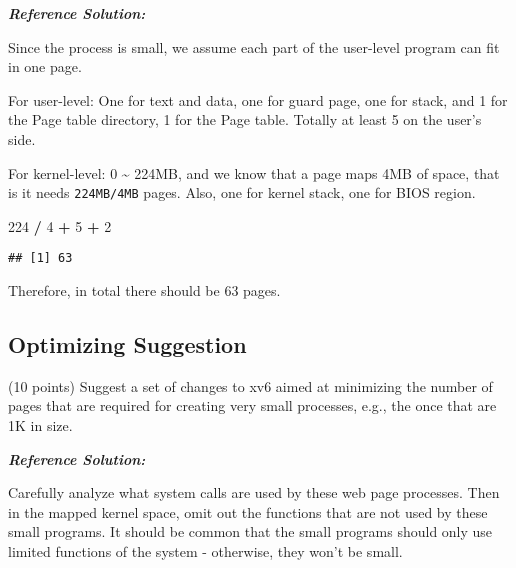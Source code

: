 \documentclass[]{article}
\newenvironment{Shaded}{\begin{snugshade}}{\end{snugshade}}
\newcommand{\DecValTok}[1]{\textcolor[rgb]{0.00,0.00,0.81}{#1}}
\newcommand{\OperatorTok}[1]{\textcolor[rgb]{0.81,0.36,0.00}{\textbf{#1}}}
\newcommand{\StringTok}[1]{\textcolor[rgb]{0.31,0.60,0.02}{#1}}
\begin{document}
\textbf{\emph{Reference Solution:}}

Since the process is small, we assume each part of the user-level
program can fit in one page.

For user-level: One for text and data, one for guard page, one for
stack, and 1 for the Page table directory, 1 for the Page table. Totally
at least 5 on the user's side.

For kernel-level: 0 \textasciitilde{} 224MB, and we know that a page
maps 4MB of space, that is it needs \texttt{224MB/4MB} pages. Also, one
for kernel stack, one for BIOS region.

\begin{Shaded}
\begin{Highlighting}[]
\DecValTok{224} \OperatorTok{/}\StringTok{ }\DecValTok{4} \OperatorTok{+}\StringTok{ }\DecValTok{5} \OperatorTok{+}\StringTok{ }\DecValTok{2}
\end{Highlighting}
\end{Shaded}

\begin{verbatim}
## [1] 63
\end{verbatim}

Therefore, in total there should be 63 pages.

\hypertarget{optimizing-suggestion}{%
\subsection{Optimizing Suggestion}\label{optimizing-suggestion}}

(10 points) Suggest a set of changes to xv6 aimed at minimizing the
number of pages that are required for creating very small processes,
e.g., the once that are 1K in size.

\textbf{\emph{Reference Solution:}}

Carefully analyze what system calls are used by these web page
processes. Then in the mapped kernel space, omit out the functions that
are not used by these small programs. It should be common that the small
programs should only use limited functions of the system - otherwise,
they won't be small.
\end{document}
